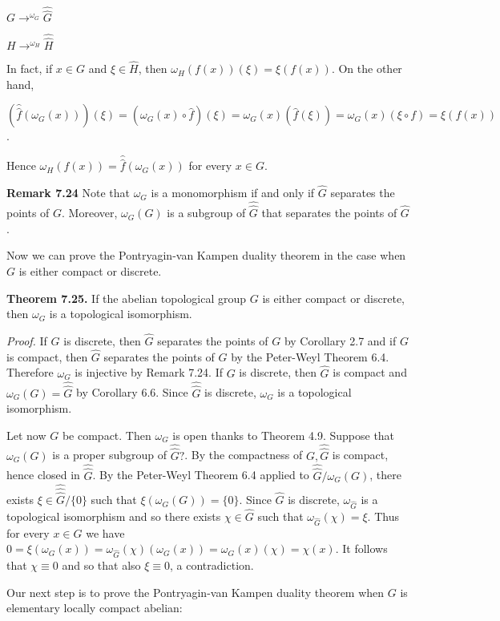 \documentclass[12pt]{article}
\begin{document}

$G \to^{\omega_G} \hat{\hat{G}}$ 

$H \to^{\omega_H} \hat{\hat{H}}$ 


In fact, if $x \in G$ and $\xi \in \hat{H}$, then $\omega_H(f(x))(\xi) = \xi(f(x))$. On the other hand,


    $(\hat{\hat{f}}(\omega_G(x)))(\xi) = (\omega_G(x) \circ \hat{f})(ξ) = ω_G(x)(\hat{f}(\xi)) = \omega_G(x)(\xi \circ f) = \xi(f(x))$.


Hence $\omega_H(f(x)) = \hat{\hat{f}}(\omega_G(x))$ for every $x \in G$.


\textbf{Remark 7.24}  Note that $\omega_G$ is a monomorphism if and only if $\hat{G}$ separates the points of $G$. Moreover, $\omega_G(G)$
is a subgroup of $\hat{\hat{G}}$ that separates the points of $\hat{G}$.


    Now we can prove the Pontryagin-van Kampen duality theorem in the case when $G$ is either compact or
discrete.


\textbf{Theorem 7.25.} If the abelian topological group $G$ is either compact or discrete, then $\omega_G$ is a topological
isomorphism.


\emph{Proof.} If $G$ is discrete, then $\hat{G}$ separates the points of $G$ by Corollary 2.7 and if $G$ is compact, then $\hat{G}$ separates
the points of $G$ by the Peter-Weyl Theorem 6.4. Therefore $\omega_G$ is injective by Remark 7.24. If $G$ is discrete,
then $\hat{G}$ is compact and $\omega_G(G) = \hat{\hat{G}}$ by Corollary 6.6. Since $\hat{\hat{G}}$ is discrete, $\omega_G$ is a topological isomorphism.


    Let now $G$ be compact. Then $\omega_G$ is open thanks to Theorem 4.9. Suppose that $\omega_G(G)$ is a proper subgroup
of $\hat{\hat{G}}?$. By the compactness of $G, \hat{\hat{G}}$ is compact, hence closed in $\hat{\hat{G}}$. By the Peter-Weyl Theorem 6.4 applied
to $\hat{\hat{G}}/\omega_G(G)$, there exists $\xi \in \hat{\hat{\hat{G}}} / \{0\}$ such that $\xi(\omega_G(G)) = \{0\}$. Since $\hat{G}$ is discrete, $\omega_{\hat{G}}$ is a topological
isomorphism and so there exists $\chi \in \hat{G}$ such that $\omega_{\hat{G}}(\chi) = \xi$. Thus for every $x \in G$ we have
$0 = \xi(\omega_G(x)) = \omega_{\hat{G}}(\chi)(\omega_G(x)) = \omega_G(x)(\chi) = \chi(x)$. It follows that $\chi ≡ 0$ and so that also $\xi ≡ 0$, a contradiction.


    Our next step is to prove the Pontryagin-van Kampen duality theorem when $G$ is elementary locally compact
abelian:
\end{document}
